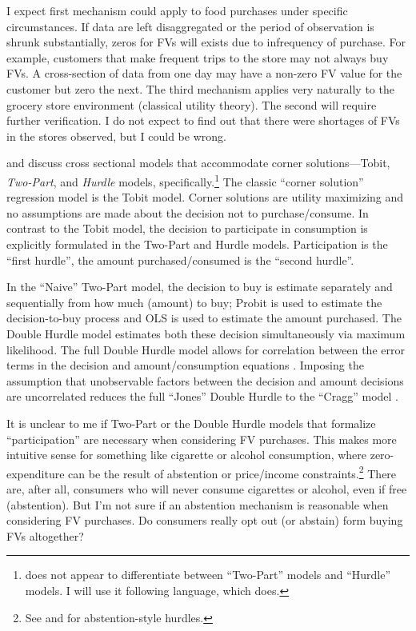 \documentclass[12pt,letterpaperpaper,]{book}
\begin{document}
I expect first mechanism could apply to food purchases under specific
circumstances. If data are left disaggregated or the period of
observation is shrunk substantially, zeros for FVs will exists due to
infrequency of purchase. For example, customers that make frequent trips
to the store may not always buy FVs. A cross-section of data from one
day may have a non-zero FV value for the customer but zero the next. The
third mechanism applies very naturally to the grocery store environment
(classical utility theory). The second will require further
verification. I do not expect to find out that there were shortages of
FVs in the stores observed, but I could be wrong.

\citet{humphreys_dealing_2013} and \citet{carlevaro_multiple_2016}
discuss cross sectional models that accommodate corner
solutions---Tobit, \emph{Two-Part}, and \emph{Hurdle} models,
specifically.\footnote{\citet{wooldridge_econometric_2010} does not
  appear to differentiate between ``Two-Part'' models and ``Hurdle''
  models. I will use it following \citet{humphreys_dealing_2013}
  language, which does.} The classic ``corner solution'' regression
model is the Tobit model. Corner solutions are utility maximizing and no
assumptions are made about the decision not to purchase/consume. In
contrast to the Tobit model, the decision to participate in consumption
is explicitly formulated in the Two-Part and Hurdle models.
Participation is the ``first hurdle'', the amount purchased/consumed is
the ``second hurdle''.

In the ``Naive'' Two-Part model, the decision to buy is estimate
separately and sequentially from how much (amount) to buy; Probit is
used to estimate the decision-to-buy process and OLS is used to estimate
the amount purchased. The Double Hurdle model estimates both these
decision simultaneously via maximum likelihood. The full Double Hurdle
model allows for correlation between the error terms in the decision and
amount/consumption equations \citep{jones_note_1992}. Imposing the
assumption that unobservable factors between the decision and amount
decisions are uncorrelated reduces the full ``Jones'' Double Hurdle to
the ``Cragg'' model \citep{cragg_statistical_1971}.

It is unclear to me if Two-Part or the Double Hurdle models that
formalize ``participation'' are necessary when considering FV purchases.
This makes more intuitive sense for something like cigarette or alcohol
consumption, where zero-expenditure can be the result of abstention or
price/income constraints.\footnote{See \citet{garcia_alternative_1996}
  and \citet{aristei_cohort_2008} for abstention-style hurdles.} There
are, after all, consumers who will never consume cigarettes or alcohol,
even if free (abstention). But I'm not sure if an abstention mechanism
is reasonable when considering FV purchases. Do consumers really opt out
(or abstain) form buying FVs altogether?
\end{document}
